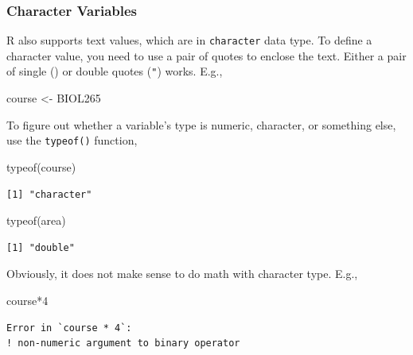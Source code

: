 \documentclass[
  letterpaper,
  DIV=11,
  numbers=noendperiod]{scrreprt}
\newenvironment{Shaded}{\begin{snugshade}}{\end{snugshade}}
\newcommand{\DecValTok}[1]{\textcolor[rgb]{0.68,0.00,0.00}{#1}}
\newcommand{\FunctionTok}[1]{\textcolor[rgb]{0.28,0.35,0.67}{#1}}
\newcommand{\NormalTok}[1]{\textcolor[rgb]{0.00,0.23,0.31}{#1}}
\newcommand{\OtherTok}[1]{\textcolor[rgb]{0.00,0.23,0.31}{#1}}
\newcommand{\SpecialCharTok}[1]{\textcolor[rgb]{0.37,0.37,0.37}{#1}}
\newcommand{\StringTok}[1]{\textcolor[rgb]{0.13,0.47,0.30}{#1}}
\begin{document}
\subsubsection{Character Variables}\label{character-variables}

R also supports text values, which are in \texttt{character} data type.
To define a character value, you need to use a pair of quotes to enclose
the text. Either a pair of single (\texttt{\textquotesingle{}}) or
double quotes (\texttt{"}) works. E.g.,

\begin{Shaded}
\begin{Highlighting}[]
\NormalTok{course }\OtherTok{\textless{}{-}} \StringTok{\textquotesingle{}BIOL265\textquotesingle{}}
\end{Highlighting}
\end{Shaded}

To figure out whether a variable's type is numeric, character, or
something else, use the \texttt{typeof()} function,

\begin{Shaded}
\begin{Highlighting}[]
\FunctionTok{typeof}\NormalTok{(course)}
\end{Highlighting}
\end{Shaded}

\begin{verbatim}
[1] "character"
\end{verbatim}

\begin{Shaded}
\begin{Highlighting}[]
\FunctionTok{typeof}\NormalTok{(area)}
\end{Highlighting}
\end{Shaded}

\begin{verbatim}
[1] "double"
\end{verbatim}

Obviously, it does not make sense to do math with character type. E.g.,

\begin{Shaded}
\begin{Highlighting}[]
\NormalTok{course}\SpecialCharTok{*}\DecValTok{4}
\end{Highlighting}
\end{Shaded}

\begin{verbatim}
Error in `course * 4`:
! non-numeric argument to binary operator
\end{verbatim}
\end{document}
